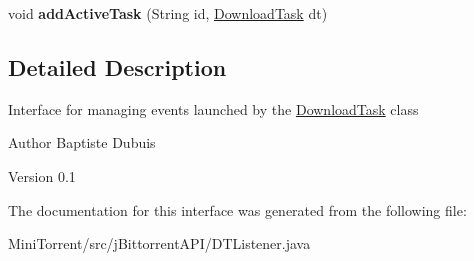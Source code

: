 \begin{DoxyCompactItemize}
\item 
\hypertarget{interfacej_bittorrent_a_p_i_1_1_d_t_listener_a78eff293a075471848d2191f21cbcb9d}{
void {\bfseries addActiveTask} (String id, \hyperlink{classj_bittorrent_a_p_i_1_1_download_task}{DownloadTask} dt)}
\label{interfacej_bittorrent_a_p_i_1_1_d_t_listener_a78eff293a075471848d2191f21cbcb9d}

\end{DoxyCompactItemize}


\subsection{Detailed Description}
Interface for managing events launched by the \hyperlink{classj_bittorrent_a_p_i_1_1_download_task}{DownloadTask} class

\begin{DoxyAuthor}{Author}
Baptiste Dubuis 
\end{DoxyAuthor}
\begin{DoxyVersion}{Version}
0.1 
\end{DoxyVersion}


The documentation for this interface was generated from the following file:\begin{DoxyCompactItemize}
\item 
MiniTorrent/src/jBittorrentAPI/DTListener.java\end{DoxyCompactItemize}
